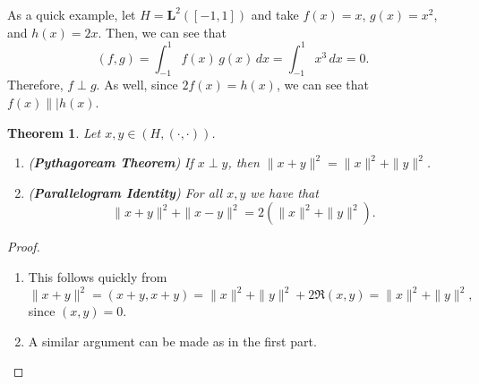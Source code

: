 \documentclass[12pt]{article}
\newtheorem{theorem}{Theorem}
\newcommand{\dint}{\displaystyle\int}
\newcommand{\ml}{\mathbf{L}}
\newcommand{\inner}{(\cdot, \cdot)}
\begin{document}
As a quick example, let $H = \ml^2([-1, 1])$ and take $f(x) = x$, $g(x) = x^2$, and $h(x) = 2x$. Then, we can see that 
\[ (f, g) = \dint_{-1}^1 f(x) \, g(x) \, dx = \dint_{-1}^1 x^3 \, dx = 0. \]
Therefore, $f \perp g$. As well, since $2 f(x) = h(x)$, we can see that $f(x) \|| h(x)$. 
\begin{theorem}
Let $x, y \in (H, \inner)$. 
\begin{enumerate}[topsep=-15pt, itemsep=0pt]
\item (\textbf{Pythagoream Theorem}) If $x \perp y$, then $\| x + y \|^2 = \| x \|^2 + \| y \|^2$. 
\item (\textbf{Parallelogram Identity}) For all $x, y$ we have that 
\[ \| x + y \|^2 + \| x - y \|^2 = 2 \left( \| x \|^2 + \| y \|^2 \right).\]
\end{enumerate}
\end{theorem}
\vspace{-25pt}
\begin{proof}
\begin{enumerate}
\item This follows quickly from 
\[\| x + y \|^2 = (x + y, x+ y) = \| x \|^2 + \| y \|^2 + 2 \Re (x, y) = \| x \|^2 + \| y \|^2, \]
since $(x, y) = 0$.
\item A similar argument can be made as in the first part.
\end{enumerate}
\end{proof}
\end{document}
